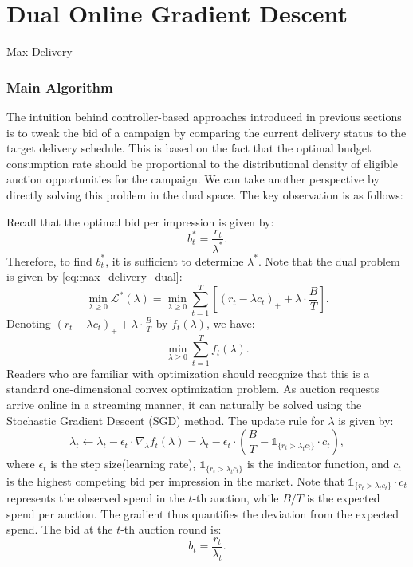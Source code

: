 \documentclass[../main.tex]{subfiles}
\begin{document}
	\chapter{Dual Online Gradient Descent}
	
	
	\begin{section}{Max Delivery}
	\subsection*{Main Algorithm}
	The intuition behind controller-based approaches introduced in previous sections is to tweak the bid of a campaign by comparing the current delivery status to the target delivery schedule. This is based on the fact that the optimal budget consumption rate should be proportional to the distributional density of eligible auction opportunities for the campaign. We can take another perspective by directly solving this problem in the dual space. The key observation is as follows:
	
	Recall that the optimal bid per impression is given by:
	\[
	b_t^{*} = \frac{r_t}{\lambda^*}.
	\]
	Therefore, to find \(b_t^{*}\), it is sufficient to determine \(\lambda^*\). Note that the dual problem is given by \autoref{eq:max_delivery_dual}:
	\[
	\min_{\lambda \geq 0}  \mathcal{L}^*(\lambda) = \min_{\lambda \geq 0}  \sum_{t=1}^{T} \left[ (r_t - \lambda c_t)_{+} + \lambda \cdot \frac{B}{T} \right].
	\]
	Denoting \((r_t - \lambda c_t)_{+} + \lambda \cdot \frac{B}{T}\) by \(f_t(\lambda)\), we have:
	\[
	\min_{\lambda \geq 0}  \sum_{t=1}^{T} f_t(\lambda).
	\]
	Readers who are familiar with optimization should recognize that this is a standard one-dimensional convex optimization problem. As auction requests arrive online in a streaming manner, it can naturally be solved using the Stochastic Gradient Descent (SGD) method. The update rule for \(\lambda\) is given by:
	\[
	\lambda_t \gets \lambda_t - \epsilon_t \cdot \nabla_{\lambda} f_t(\lambda) = \lambda_t - \epsilon_t \cdot \left( \frac{B}{T} - \mathds{1}_{ \{r_t > \lambda_t c_t \}} \cdot c_t \right),
	\]
	where \(\epsilon_t\) is the step size(learning rate), \(\mathds{1}_{\{r_t > \lambda_t c_t\}}\) is the indicator function, and \(c_t\) is the highest competing bid per impression in the market. Note that \(\mathds{1}_{ \{r_t > \lambda_t c_t \}} \cdot c_t\) represents the observed spend in the \(t\)-th auction, while \(B/T\) is the expected spend per auction. The gradient thus quantifies the deviation from the expected spend. The bid at the \(t\)-th auction round is:
	\[
	b_t = \frac{r_t}{\lambda_t}.
	\]
	

\end{section}
\end{document}
